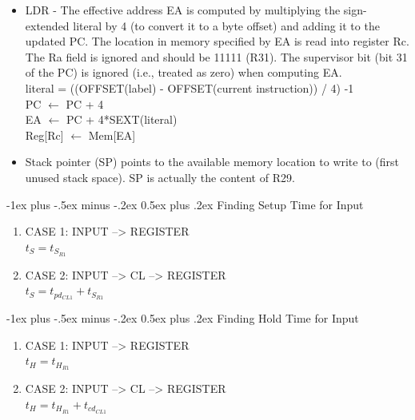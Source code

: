 \documentclass[9pt,landscape]{extarticle}
\makeatletter
\renewcommand{\section}{\@startsection{section}{1}{0mm}%
                                {-1ex plus -.5ex minus -.2ex}%
                                {0.5ex plus .2ex}%
                                {\normalfont\large\bfseries}}
\makeatother
\begin{document}
\begin{multicols*}{5}
\begin{itemize}
\item LDR - The effective address EA is computed by multiplying the sign-extended literal by 4 (to
convert it to a byte offset) and adding it to the updated PC. The location in memory specified
by EA is read into register Rc. The Ra field is ignored and should be 11111 (R31). The
supervisor bit (bit 31 of the PC) is ignored (i.e., treated as zero) when computing EA. \\
literal = ((OFFSET(label) - OFFSET(current instruction)) / 4) -1 \\
PC $\leftarrow$ PC + 4 \\
EA $\leftarrow$ PC + 4*SEXT(literal) \\
Reg[Rc] $\leftarrow$ Mem[EA] \\

\item Stack pointer (SP) points to the available memory location to write to (first unused stack space). SP is actually the content of R29.

\end{itemize}

\section{Finding Setup Time for Input}
\begin{enumerate}
\item CASE 1: INPUT --> REGISTER \\
$t_{S} = t_{S_{R1}}$
\item CASE 2: INPUT --> CL --> REGISTER \\
$t_{S} = t_{pd_{CL1}}+ t_{S_{R1}}$
\end{enumerate}

\section{Finding Hold Time for Input}
\begin{enumerate}
\item CASE 1: INPUT --> REGISTER \\
$t_{H} = t_{H_{R1}}$
\item CASE 2: INPUT --> CL --> REGISTER \\
$t_{H} = t_{H_{R1}}+ t_{cd_{CL1}}$
\end{enumerate}


\end{multicols*}
\end{document}
